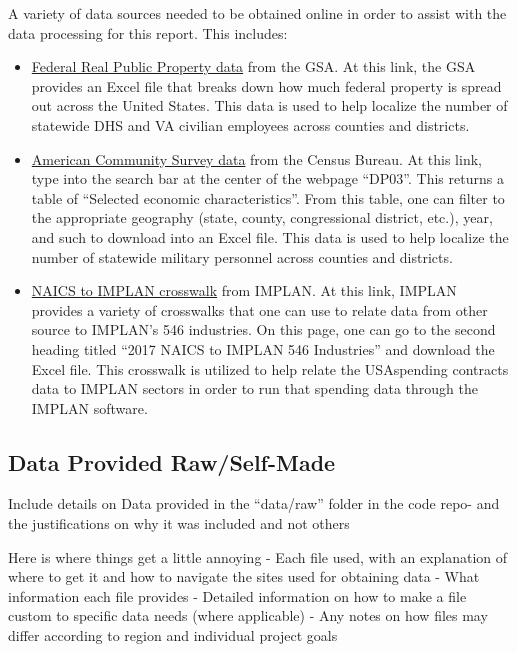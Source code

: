 \documentclass[
]{book}
\begin{document}
A variety of data sources needed to be obtained online in order to assist with the data processing for this report. This includes:

\begin{itemize}
\item
  \href{https://www.gsa.gov/policy-regulations/policy/real-property-policy/asset-management/federal-real-property-profile-frpp/federal-real-property-public-data-set}{Federal Real Public Property data} from the GSA. At this link, the GSA provides an Excel file that breaks down how much federal property is spread out across the United States. This data is used to help localize the number of statewide DHS and VA civilian employees across counties and districts.
\item
  \href{https://data.census.gov/cedsci/}{American Community Survey data} from the Census Bureau. At this link, type into the search bar at the center of the webpage ``DP03''. This returns a table of ``Selected economic characteristics''. From this table, one can filter to the appropriate geography (state, county, congressional district, etc.), year, and such to download into an Excel file. This data is used to help localize the number of statewide military personnel across counties and districts.
\item
  \href{https://support.implan.com/hc/en-us/articles/360034896614-546-Industries-Conversions-Bridges-Construction-2018-Data}{NAICS to IMPLAN crosswalk} from IMPLAN. At this link, IMPLAN provides a variety of crosswalks that one can use to relate data from other source to IMPLAN's 546 industries. On this page, one can go to the second heading titled ``2017 NAICS to IMPLAN 546 Industries'' and download the Excel file. This crosswalk is utilized to help relate the USAspending contracts data to IMPLAN sectors in order to run that spending data through the IMPLAN software.
\end{itemize}

\hypertarget{data-provided-rawself-made}{%
\subsection{Data Provided Raw/Self-Made}\label{data-provided-rawself-made}}

Include details on Data provided in the ``data/raw'' folder in the code repo- and the justifications on why it was included and not others

Here is where things get a little annoying
- Each file used, with an explanation of where
to get it and how to navigate the sites used for obtaining data
- What information each file provides
- Detailed information on how to make a file custom to specific data needs (where applicable)
- Any notes on how files may differ according to region and individual project goals
\end{document}
